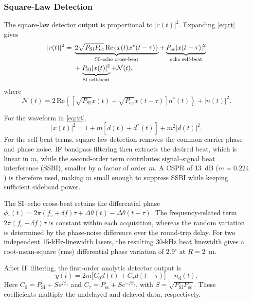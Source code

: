 \documentclass[10pt,journal]{IEEEtran}
\DeclareRobustCommand{\rev}[1]{\textcolor{revisioncolor}{#1}}
\begin{document}
\subsubsection{Square-Law Detection}
\label{sec:sld}

The square-law detector output is proportional to $|r(t)|^2$.
Expanding \eqref{eq:rt} gives
\begin{align}
|r(t)|^2={}&
\underbrace{2\sqrt{P_{\mathrm{SI}}P_{\mathrm{ec}}}
\,\mathrm{Re}\{x(t)x^*(t-\tau)\}}_{\text{SI--echo cross-beat}}
+\underbrace{P_{\mathrm{ec}}|x(t-\tau)|^2}_{\text{echo self-beat}}
\notag\\
&+\underbrace{P_{\mathrm{SI}}|x(t)|^2}_{\text{SI self-beat}}
+\mathcal N(t),
\label{eq:sq_expand}
\end{align}
where
\begin{equation}
\mathcal N(t)
=
2\,\mathrm{Re}\!\left\{
\left[
\sqrt{P_{\mathrm{SI}}}x(t)
+\sqrt{P_{\mathrm{ec}}}x(t-\tau)
\right]n^*(t)
\right\}
+|n(t)|^2.
\label{eq:noise}
\end{equation}

For the waveform in \eqref{eq:xt},
\begin{equation}
|x(t)|^2
=
1+m[d(t)+d^*(t)]+m^2|d(t)|^2.
\label{eq:selfbeat}
\end{equation}
For the self-beat terms, square-law detection removes the common carrier
phase and phase noise. IF bandpass
filtering then extracts the desired beat, which is linear in $m$, while
the second-order term contributes signal--signal beat interference
(SSBI), smaller by a factor of order $m$. A CSPR of 13~dB
($m=0.224$) is therefore used, making $m$ small enough to suppress SSBI
while keeping sufficient sideband power.

The SI--echo cross-beat retains the differential phase
$\phi_\tau(t)=2\pi(f_{\mathrm c}+\delta f)\tau+
\Delta\theta(t)-\Delta\theta(t-\tau)$. The frequency-related term
$2\pi(f_{\mathrm c}+\delta f)\tau$ is constant within each acquisition,
whereas the random variation is determined by the phase-noise difference
over the round-trip delay. For two independent 15-kHz-linewidth lasers,
the resulting 30-kHz beat linewidth gives a root-mean-square (rms)
differential phase variation of $2.9^\circ$ at $R=2$~m.

\rev{After IF filtering, the first-order analytic detector output is}
{\color{revisioncolor}
\begin{equation}
y(t)=2m\big[C_0d(t)+C_\tau d(t-\tau)\big]+n_{\mathrm d}(t).
\label{eq:yt}
\end{equation}}
\rev{Here \(C_0=P_{\mathrm{SI}}+Se^{j\phi_\tau}\) and
\(C_\tau=P_{\mathrm{ec}}+Se^{-j\phi_\tau}\), with
\(S=\sqrt{P_{\mathrm{SI}}P_{\mathrm{ec}}}\). These coefficients
multiply the undelayed and delayed data, respectively.}
\end{document}
